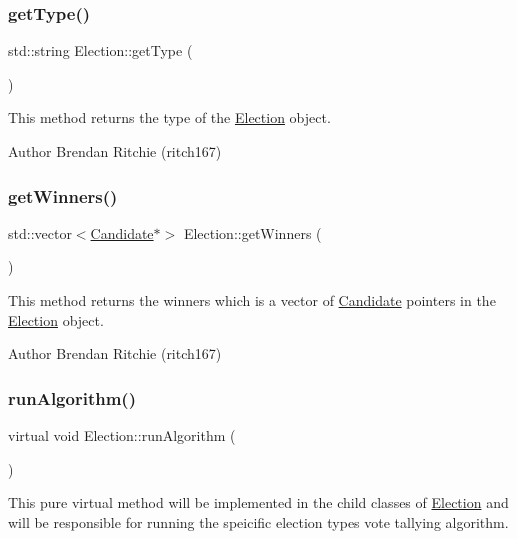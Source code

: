 \subsubsection{\texorpdfstring{get\+Type()}{getType()}}
{\footnotesize\ttfamily std\+::string Election\+::get\+Type (\begin{DoxyParamCaption}{ }\end{DoxyParamCaption})}

This method returns the type of the \hyperlink{classElection}{Election} object. \begin{DoxyAuthor}{Author}
Brendan Ritchie (ritch167) 
\end{DoxyAuthor}
\mbox{\label{classElection_a8cc211952aa00399649c8660eb62189c}} 
\subsubsection{\texorpdfstring{get\+Winners()}{getWinners()}}
{\footnotesize\ttfamily std\+::vector$<$\hyperlink{classCandidate}{Candidate}$\ast$$>$ Election\+::get\+Winners (\begin{DoxyParamCaption}{ }\end{DoxyParamCaption})}

This method returns the winners which is a vector of \hyperlink{classCandidate}{Candidate} pointers in the \hyperlink{classElection}{Election} object. \begin{DoxyAuthor}{Author}
Brendan Ritchie (ritch167) 
\end{DoxyAuthor}
\mbox{\label{classElection_a059659576ebb0416ecd8005f684461d6}} 
\subsubsection{\texorpdfstring{run\+Algorithm()}{runAlgorithm()}}
{\footnotesize\ttfamily virtual void Election\+::run\+Algorithm (\begin{DoxyParamCaption}{ }\end{DoxyParamCaption})\hspace{0.3cm}{\ttfamily [pure virtual]}}

This pure virtual method will be implemented in the child classes of \hyperlink{classElection}{Election} and will be responsible for running the speicific election type\textquotesingle{}s vote tallying algorithm. 

